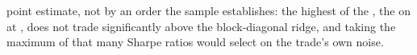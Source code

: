 point estimate, not by an order the sample establishes: the highest of the \cmMasterN{}, %
the \cmTopShLabel{} on \cmTopShInputs{} at \cmTopShMid{}, does not trade significantly above
the block-diagonal ridge, and taking the maximum of that many Sharpe ratios would select on
the trade's own noise.

